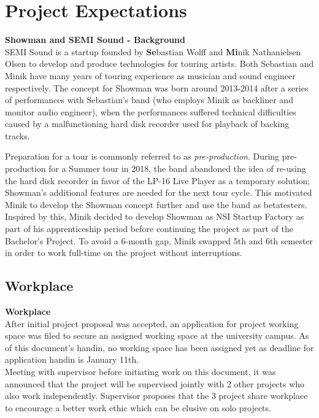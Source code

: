 \chapter{Project Expectations}
\textbf{Showman and SEMI Sound - Background} \\
SEMI Sound is a startup founded by \textbf{Se}bastian Wolff and \textbf{Mi}nik Nathanielsen Olsen to develop and produce technologies for touring artists. Both Sebastian and Minik have many years of touring experience  as musician and sound engineer respectively. The concept for Showman was born around 2013-2014 after a series of performances with Sebastian's band (who employs Minik as backliner and monitor audio engineer), when the performances suffered technical difficulties caused by a malfunctioning hard disk recorder used for playback of backing tracks. \newline

Preparation for a tour is commonly referred to as \textit{pre-production}. During pre-production for a Summer tour in 2018, the band abandoned the idea of re-using the hard disk recorder in favor of the LP-16 Live Player as a temporary solution; Showman's additional features are needed for the next tour cycle. This motivated Minik to develop the Showman concept further and use the band as betatesters. Inspired by this, Minik decided to develop Showman as NSI Startup Factory as part of his apprenticeship period before continuing the project as part of the Bachelor's Project. To avoid a 6-month gap, Minik swapped 5th and 6th semester in order to work full-time on the project without interruptions. \newline

\section{Workplace}
\textbf{Workplace} \\
After initial project proposal was accepted, an application for project working space was filed to secure an assigned working space at the university campus. As of this document's handin, no working space has been assigned yet as deadline for application handin is January 11th. \\

Meeting with supervisor before initiating work on this document, it was announced that the project will be supervised jointly with 2 other projects who also work independently. Supervisor proposes that the 3 project share workplace to encourage a better work ethic which can be elusive on solo projects. \\

